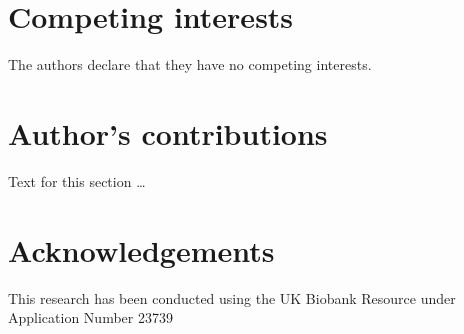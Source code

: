 \documentclass[doublespacing]{bmcart}
\begin{document}
\begin{backmatter}

\section*{Competing interests}
  The authors declare that they have no competing interests.

\section*{Author's contributions}
    Text for this section \ldots

\section*{Acknowledgements}
  This research has been conducted using the UK Biobank Resource under Application Number 23739





\end{backmatter}
\end{document}
